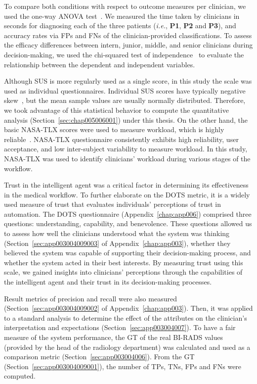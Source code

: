 \vspace{1.5mm}

To compare both conditions with respect to outcome measures per clinician, we used the one-way \ac{ANOVA} test~\cite{SADEGHI2022105554, 10.1145/3491102.3517791}.
We measured the time taken by clinicians in seconds for diagnosing each of the three patients ({\it i.e.}, {\bf P1}, {\bf P2} and {\bf P3}), and accuracy rates via \acp{FP} and \acp{FN} of the clinician-provided classifications.
To assess the efficacy differences between intern, junior, middle, and senior clinicians during decision-making, we used the chi-squared test of independence~\cite{10.1145/3411764.3445464} to evaluate the relationship between the dependent and independent variables.

Although \ac{SUS} is more regularly used as a single score, in this study the scale was used as individual questionnaires.
Individual \ac{SUS} scores have typically negative skew~\cite{10.1145/3399715.3399744}, but the mean sample values are usually normally distributed.
Therefore, we took advantage of this statistical behavior to compute the quantitative analysis (Section~\ref{sec:chap005006001}) under this thesis.
On the other hand, the basic \ac{NASA-TLX} scores were used to measure workload, which is highly reliable~\cite{10.1145/3399715.3399744}.
\ac{NASA-TLX} questionnaire consistently exhibits high reliability, user acceptance, and low inter-subject variability to measure workload.
In this study, \ac{NASA-TLX} was used to identify clinicians' workload during various stages of the workflow.

Trust in the intelligent agent was a critical factor in determining its effectiveness in the medical workflow.
To further elaborate on the \ac{DOTS} metric, it is a widely used measure of trust that evaluates individuals' perceptions of trust in automation.
The \ac{DOTS} questionnaire (Appendix~\ref{chap:app006}) comprised three questions: understanding, capability, and benevolence.
These questions allowed us to assess how well the clinicians understood what the system was thinking (Section~\ref{sec:app003004009003} of Appendix~\ref{chap:app003}), whether they believed the system was capable of supporting their decision-making process, and whether the system acted in their best interests.
By measuring trust using this scale, we gained insights into clinicians' perceptions through the capabilities of the intelligent agent and their trust in its decision-making processes.

Result metrics of precision and recall were also measured (Section~\ref{sec:app003004009002} of Appendix~\ref{chap:app003}).
Then, it was applied to a standard analysis to determine the effect of the attributes on the clinician's interpretation and expectations (Section~\ref{sec:app003004007}).
To have a fair measure of the system performance, the \ac{GT} of the real \ac{BI-RADS} values (provided by the head of the radiology department) was calculated and used as a comparison metric (Section~\ref{sec:app003004006}).
From the \ac{GT} (Section~\ref{sec:app003004009001}), the number of \acfp{TP}, \acfp{TN}, \acfp{FP} and \acfp{FN} were computed.

